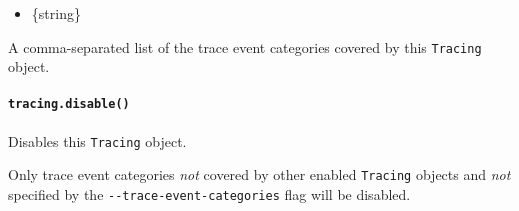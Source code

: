\begin{itemize}
\tightlist
\item
  \{string\}
\end{itemize}

A comma-separated list of the trace event categories covered by this
\texttt{Tracing} object.

\paragraph{\texorpdfstring{\texttt{tracing.disable()}}{tracing.disable()}}\label{tracing.disable}

Disables this \texttt{Tracing} object.

Only trace event categories \emph{not} covered by other enabled
\texttt{Tracing} objects and \emph{not} specified by the
\texttt{-\/-trace-event-categories} flag will be disabled.

\begin{Shaded}
\begin{Highlighting}[]
\OperatorTok{=} \NormalTok{(}\NormalTok{)}\OperatorTok{;}
\OperatorTok{=}\NormalTok{(\{ }\OperatorTok{:}\NormalTok{ [}\OperatorTok{,} \NormalTok{] \})}\OperatorTok{;}
\OperatorTok{=}\NormalTok{(\{ }\OperatorTok{:}\NormalTok{ [}\OperatorTok{,} \NormalTok{] \})}\OperatorTok{;}
\NormalTok{()}\OperatorTok{;}
\NormalTok{()}\OperatorTok{;}

\NormalTok{())}\OperatorTok{;}

\NormalTok{()}\OperatorTok{;} 

\NormalTok{())}\OperatorTok{;}
\end{Highlighting}
\end{Shaded}

